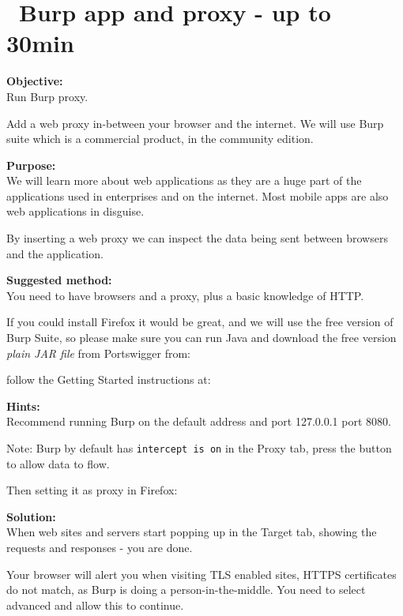 \documentclass[a4paper,11pt,notitlepage]{report}
\begin{document}
\chapter{\faInfoCircle\ Burp app and proxy - up to 30min}
\label{ex:burp-basic}

{\bf Objective:}\\
Run Burp proxy.

Add a web proxy in-between your browser and the internet. We will use Burp suite which is a commercial product, in the community edition.

{\bf Purpose:}\\
We will learn more about web applications as they are a huge part of the applications used in enterprises and on the internet. Most mobile apps are also web applications in disguise.

By inserting a web proxy we can inspect the data being sent between browsers and the application.

{\bf Suggested method:}\\
You need to have browsers and a proxy, plus a basic knowledge of HTTP.

If you could install Firefox it would be great, and we will use the
free version of Burp Suite, so please make sure you can run Java and
download the free version \emph{plain JAR file} from Portswigger from:


follow the Getting Started instructions at:\\


{\bf Hints:}\\
Recommend running Burp on the default address and port 127.0.0.1 port 8080.

Note: Burp by default has \verb+intercept is on+ in the Proxy tab, press the button to allow data to flow.


Then setting it as proxy in Firefox:


{\bf Solution:}\\
When web sites and servers start popping up in the Target tab, showing the requests and responses - you are done.

Your browser will alert you when visiting TLS enabled sites, HTTPS certificates do not match, as Burp is doing a person-in-the-middle. You need to select advanced and allow this to continue.
\end{document}
